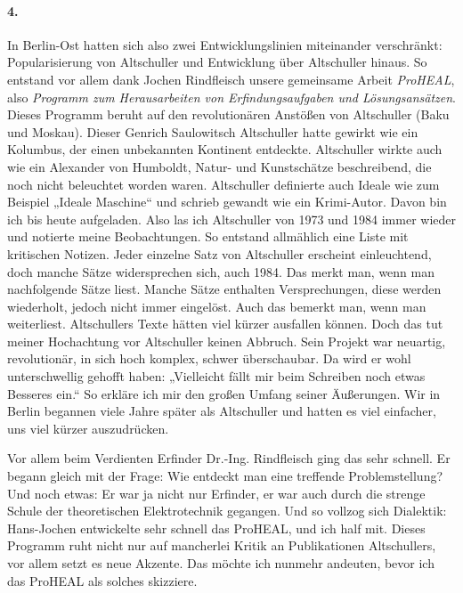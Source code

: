 \documentclass[12pt,a4paper]{article}
\begin{document}
\paragraph{4.}
In Berlin-Ost hatten sich also zwei Entwicklungslinien miteinander
verschränkt: Popularisierung von Altschuller und Entwicklung über Altschuller
hinaus. So entstand vor allem dank Jochen Rindfleisch unsere gemeinsame Arbeit
\emph{ProHEAL}, also \emph{Programm zum Herausarbeiten von Erfindungsaufgaben
  und Lösungsansätzen}. Dieses Programm beruht auf den revolutionären Anstößen
von Altschuller (Baku und Moskau). Dieser Genrich Saulowitsch Altschuller
hatte gewirkt wie ein Kolumbus, der einen unbekannten Kontinent entdeckte.
Altschuller wirkte auch wie ein Alexander von Humboldt, Natur- und
Kunstschätze beschreibend, die noch nicht beleuchtet worden waren. Altschuller
definierte auch Ideale wie zum Beispiel „Ideale Maschine“ und schrieb gewandt
wie ein Krimi-Autor. Davon bin ich bis heute aufgeladen. Also las ich
Altschuller von 1973 und 1984 immer wieder und notierte meine Beobachtungen.
So entstand allmählich eine Liste mit kritischen Notizen. Jeder einzelne Satz
von Altschuller erscheint einleuchtend, doch manche Sätze widersprechen sich,
auch 1984. Das merkt man, wenn man nachfolgende Sätze liest. Manche Sätze
enthalten Versprechungen, diese werden wiederholt, jedoch nicht immer
eingelöst. Auch das bemerkt man, wenn man weiterliest. Altschullers Texte
hätten viel kürzer ausfallen können. Doch das tut meiner Hochachtung vor
Altschuller keinen Abbruch. Sein Projekt war neuartig, revolutionär, in sich
hoch komplex, schwer überschaubar. Da wird er wohl unterschwellig gehofft
haben: „Vielleicht fällt mir beim Schreiben noch etwas Besseres ein.“ So
erkläre ich mir den großen Umfang seiner Äußerungen. Wir in Berlin begannen
viele Jahre später als Altschuller und hatten es viel einfacher, uns viel
kürzer auszudrücken.

Vor allem beim Verdienten Erfinder Dr.-Ing. Rindfleisch ging das sehr schnell.
Er begann gleich mit der Frage: Wie entdeckt man eine treffende
Problemstellung?  Und noch etwas: Er war ja nicht nur Erfinder, er war auch
durch die strenge Schule der theoretischen Elektrotechnik gegangen. Und so
vollzog sich Dialektik: Hans-Jochen entwickelte sehr schnell das ProHEAL, und
ich half mit. Dieses Programm ruht nicht nur auf mancherlei Kritik an
Publikationen Altschullers, vor allem setzt es neue Akzente. Das möchte ich
nunmehr andeuten, bevor ich das ProHEAL als solches skizziere.
\end{document}
